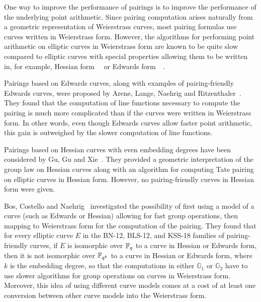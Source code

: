 One way to improve the performance of pairings is
to improve the performance of the underlying point arithmetic.
Since pairing computation arises naturally from a geometric representation of Weierstrass curves,
most pairing formulas use curves written in Weierstrass form.
However, the algorithms for performing point arithmetic on elliptic curves in Weierstrass form
are known to be quite slow compared to elliptic curves with special properties allowing them to be written in,
for example, Hessian form~\cite{2001/smart}~\cite{2001/joye} or
Edwards form~\cite{2007/edwards}~\cite{2007/bernstein-newelliptic}.

Pairings based on Edwards curves,
along with examples of pairing-friendly Edwards curves,
were proposed by Arene, Lange, Naehrig and Ritzenthaler~\cite{2009/fastertate}.
They found that the computation of line functions necessary to compute the pairing
is much more complicated than if the curves were written in Weierstrass form.
In other words,
even though Edwards curves allow faster point arithmetic,
this gain is outweighed by the slower computation of line functions.

Pairings based on Hessian curves with even embedding degrees have been considered by Gu, Gu and Xie~\cite{2010/Gu}.
They provided a geometric interpretation of the group law on Hessian curves
along with an algorithm for computing Tate pairing on elliptic curves in Hessian form.
However, no pairing-friendly curves in Hessian form were given.

Bos, Costello and Naehrig~\cite{2013/bos-pairing} investigated the possibility of first
using a model of a curve (such as Edwards or Hessian) allowing for fast group operations,
then mapping to Weierstrass form for the computation of the pairing.
They found that for every elliptic curve $E$ in the BN-12, BLS-12, and KSS-18 families of pairing-friendly curves,
if $E$ is isomorphic over $\mathbb{F}_{q}$ to a curve in Hessian or Edwards form,
then it is not isomorphic over $\mathbb{F}_{q^{k}}$ to a curve in Hessian or Edwards form,
where $k$ is the embedding degree, so that the computations in either $\mathbb{G}_1$ or $\mathbb{G}_2$
have to use slower algorithms for group operations on curves in Weierstrass form.
Moreover, this idea of using different curve models comes at a cost of at least one conversion
between other curve models into the Weierstrass form.

